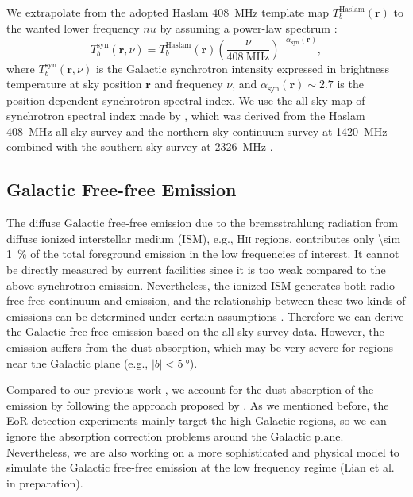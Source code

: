\documentclass[modern]{aastex61}
\newcommand{\R}[1]{\mathrm{#1}}
\newcommand{\Halpha}{\text{H$\alpha$}}
\newcommand{\Hii}{H\textsc{ii}}
\begin{document}
We extrapolate from the adopted Haslam \SI{408}{\MHz} template map
$T_b^{\R{Haslam}}(\bm{r})$ to the wanted lower frequency $nu$ by assuming
a power-law spectrum \citep{wang2010,bonaldi2015}:
\begin{equation}
  \label{eq:gsync-extrap}
  T_b^{\R{syn}}(\bm{r}, \nu) = T_b^{\R{Haslam}}(\bm{r})
    \left( \frac{\nu}{\SI{408}{\MHz}} \right)^{-\alpha_{\R{syn}}(\bm{r})},
\end{equation}
where $T_b^{\R{syn}}(\bm{r}, \nu)$ is the Galactic synchrotron intensity
expressed in brightness temperature at sky position $\bm{r}$ and
frequency $\nu$, and $\alpha_{\R{syn}}(\bm{r}) \sim 2.7$ is
the position-dependent synchrotron spectral index.
We use the all-sky map of synchrotron spectral index made by
\citet{giardino2002}, which was derived from the Haslam \SI{408}{\MHz}
all-sky survey and the northern sky continuum survey at \SI{1420}{\MHz}
\citep{reich1986} combined with the southern sky survey at
\SI{2326}{\MHz} \citep{jonas1998}.


\subsection{Galactic Free-free Emission}
\label{sec:fg-gfree}

The diffuse Galactic free-free emission due to the bremsstrahlung
radiation from diffuse ionized interstellar medium (ISM),
e.g., \Hii{} regions, contributes only \SI{\sim 1}{\percent} of the total
foreground emission in the low frequencies of interest.
It cannot be directly measured by current facilities since it is too
weak compared to the above synchrotron emission.
Nevertheless, the ionized ISM generates both radio free-free continuum
and \Halpha{} emission, and the relationship between these two kinds of
emissions can be determined under certain assumptions \citep{dickinson2003}.
Therefore we can derive the Galactic free-free emission based on the
all-sky \Halpha{} survey data.
However, the \Halpha{} emission suffers from the dust absorption, which
may be very severe for regions near the Galactic plane
(e.g., $|b| < \SI{5}{\degree}$).

Compared to our previous work \citep{wang2010}, we account for the
dust absorption of the \Halpha{} emission by following the approach
proposed by \citet{dickinson2003}.
As we mentioned before, the EoR detection experiments mainly target
the high Galactic regions, so we can ignore the absorption correction
problems around the Galactic plane.
Nevertheless, we are also working on a more sophisticated and
physical model to simulate the Galactic free-free emission at the low
frequency regime (Lian et al. in preparation).
\end{document}
